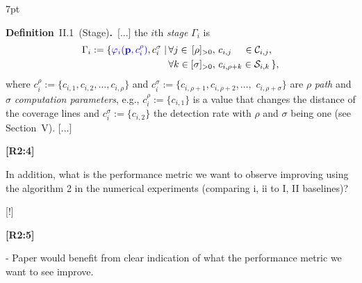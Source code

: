 \documentclass[10pt]{letter}
\newenvironment{formal}{%
  \def\FrameCommand{%
    \hspace{1pt}%
    {\color{red}\vrule width 2pt}%
    {\color{formalshade}\vrule width 4pt}%
    \colorbox{formalshade}%
  }%
  \MakeFramed{\advance\hsize-\width\FrameRestore}%
  \noindent\hspace{-4.55pt}%
  \begin{adjustwidth}{}{7pt}%
  \vspace{2pt}\vspace{2pt}%
}
{%
  \vspace{2pt}\end{adjustwidth}\endMakeFramed%
}
\begin{document}
{  \begin{formal}
    \color{black} 
    \textbf{Definition}~II.1~(Stage)\textbf{.}~[...] the $i$th \emph{stage} $\Gamma_i$ %
      is
    \begin{equation*}\begin{split}
        \Gamma_i:=\{{\color{blue}\varphi_i(\mathbf{p}%
        ,c_i^\rho)},c_i^\sigma\mid
        \,&\forall j\in\,[\rho]_{>0},\,c_{i,j}\,\,\,\,\,\,\,\in\mathcal{C}_{i,j},\,\\
          &\forall k\in[\sigma]_{>0},\,c_{i,\rho+k}\in\mathcal{S}_{i,k}\,\},
    \end{split}\end{equation*}
    where $c_i^\rho${\color{blue}$:=\{c_{i,1},c_{i,2},\dots,c_{i,\rho}\}$} and $c_i^\sigma${\color{blue}$:=\{c_{i,\rho+1},c_{i,\rho+2},\dots,$ $c_{i,\rho+\sigma}\}$} are $\rho$ \emph{path} and $\sigma$ \emph{computation parameters}{\color{blue}, e.g., $c_i^\rho:=\{c_{i,1}\}$ is a value that changes the distance of the coverage lines and $c^\sigma_i:=\{c_{i,2}\}$ the detection rate with $\rho$ and $\sigma$ being one (see Section~{\color{red}V})}. [...]
    \vspace*{1ex}
  \end{formal}



  }

  {\hspace*{-4.5em}\textbf{[R2:4]}\vspace*{-1.9em}}

  In addition, what is the performance metric we want to observe improving using the algorithm 2 in the numerical experiments (comparing i, ii to I, II baselines)? 
  
  {\color{blue} 
  
  {\hspace*{-4.5em}{[R2:4]}\vspace*{-1.9em}}

  [!]}

{\hspace*{-4.5em}\textbf{[R2:5]}\vspace*{-1.9em}}

- Paper would benefit from clear indication of what the performance metric we want to see improve. 
  
\end{document}
